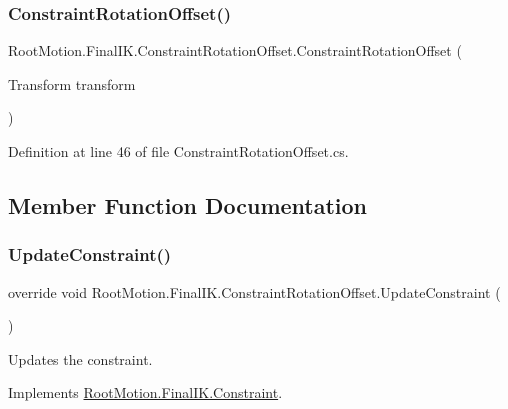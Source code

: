 \subsubsection{\texorpdfstring{Constraint\+Rotation\+Offset()}{ConstraintRotationOffset()}\hspace{0.1cm}{\footnotesize\ttfamily [2/2]}}
{\footnotesize\ttfamily Root\+Motion.\+Final\+I\+K.\+Constraint\+Rotation\+Offset.\+Constraint\+Rotation\+Offset (\begin{DoxyParamCaption}\item[{Transform}]{transform }\end{DoxyParamCaption})}



Definition at line 46 of file Constraint\+Rotation\+Offset.\+cs.



\subsection{Member Function Documentation}
\mbox{\label{class_root_motion_1_1_final_i_k_1_1_constraint_rotation_offset_a5116eea04782bf913c98dadb380cf8cc}} 
\subsubsection{\texorpdfstring{Update\+Constraint()}{UpdateConstraint()}}
{\footnotesize\ttfamily override void Root\+Motion.\+Final\+I\+K.\+Constraint\+Rotation\+Offset.\+Update\+Constraint (\begin{DoxyParamCaption}{ }\end{DoxyParamCaption})\hspace{0.3cm}{\ttfamily [virtual]}}



Updates the constraint. 



Implements \mbox{\hyperlink{class_root_motion_1_1_final_i_k_1_1_constraint_a3abc634189f065586d8d57c653c22fdd}{Root\+Motion.\+Final\+I\+K.\+Constraint}}.



